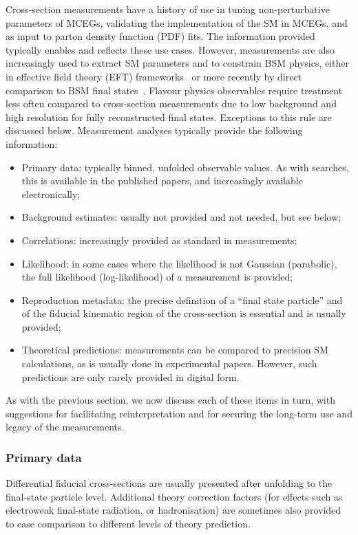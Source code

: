 \documentclass[a4paper,aps,prd,longbibliography,notitlepage,showpacs,amsmath,amssymb,superscriptaddress,nofootinbib,floatfix,11pt,preprintnumbers]{revtex4-1-mod}
\begin{document}
Cross-section measurements have a history of use in tuning non-perturbative parameters of MCEGs,
validating the implementation of the SM in MCEGs, and as input to parton density function (PDF) fits. The information provided typically enables and reflects these use cases. However, measurements are also increasingly used to extract SM parameters and to constrain BSM physics, either in effective field theory (EFT) frameworks~\cite{Buckley:2015lku,Butterworth:2016sqg} or more recently by direct comparison to BSM final states~\cite{Darme:2018dvz}.
Flavour physics observables require treatment less often compared to cross-section measurements due to low background and high resolution for fully reconstructed final states. Exceptions to this rule are discussed below.
%
Measurement analyses typically provide the following information:
%
\begin{itemize}
    \item Primary data: typically binned, unfolded observable values. As with searches, this is available in the published papers, and increasingly available electronically;
    \item Background estimates: usually not provided and not needed, but see below;
    \item Correlations: increasingly provided as standard in measurements;
    \item Likelihood: in some cases where the likelihood is not Gaussian (parabolic), the full likelihood (log-likelihood) of a measurement is provided;
    \item Reproduction metadata: the precise definition of a ``final state particle'' and of the fiducial kinematic region of the cross-section is essential and is usually provided;
    \item Theoretical predictions: measurements can be compared to precision SM calculations, as is usually done in experimental papers. However, such predictions are only rarely provided in digital form.
\end{itemize}

As with the previous section, we now discuss each of these items in turn, with suggestions for  facilitating reinterpretation and for securing the long-term use and legacy of the measurements.\\

\subsubsection{Primary data}
Differential fiducial cross-sections are usually presented after unfolding to the final-state particle level. Additional theory correction factors (for effects such as electroweak final-state radiation, or hadronisation) are sometimes also provided to ease comparison to different levels of theory prediction.
\end{document}
